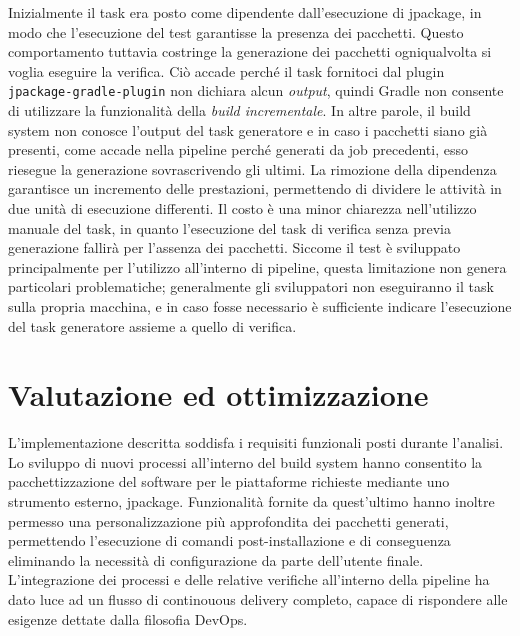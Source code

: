 

Inizialmente il task era posto come dipendente dall'esecuzione di jpackage, in modo che l'esecuzione del test garantisse la presenza dei pacchetti. Questo comportamento tuttavia costringe la generazione dei pacchetti ogniqualvolta si voglia eseguire la verifica. Ciò accade perché il task fornitoci dal plugin \texttt{jpackage-gradle-plugin} non dichiara alcun \textit{output}, quindi Gradle non consente di utilizzare la funzionalità della \textit{build incrementale}. In altre parole, il build system non conosce l'output del task generatore e in caso i pacchetti siano già presenti, come accade nella pipeline perché generati da job precedenti, esso riesegue la generazione sovrascrivendo gli ultimi. La rimozione della dipendenza garantisce un incremento delle prestazioni, permettendo di dividere le attività in due unità di esecuzione differenti. Il costo è una minor chiarezza nell'utilizzo manuale del task, in quanto l'esecuzione del task di verifica senza previa generazione fallirà per l'assenza dei pacchetti. Siccome il test è sviluppato principalmente per l'utilizzo all'interno di pipeline, questa limitazione non genera particolari problematiche; generalmente gli sviluppatori non eseguiranno il task sulla propria macchina, e in caso fosse necessario è sufficiente indicare l'esecuzione del task generatore assieme a quello di verifica.

\section{Valutazione ed ottimizzazione}

L'implementazione descritta soddisfa i requisiti funzionali posti durante l'analisi. Lo sviluppo di nuovi processi all'interno del build system hanno consentito la pacchettizzazione del software per le piattaforme richieste mediante uno strumento esterno, jpackage. Funzionalità fornite da quest'ultimo hanno inoltre permesso una personalizzazione più approfondita dei pacchetti generati, permettendo l'esecuzione di comandi post-installazione e di conseguenza eliminando la necessità di configurazione da parte dell'utente finale. L'integrazione dei processi e delle relative verifiche all'interno della pipeline ha dato luce ad un flusso di continouous delivery completo, capace di rispondere alle esigenze dettate dalla filosofia DevOps.

